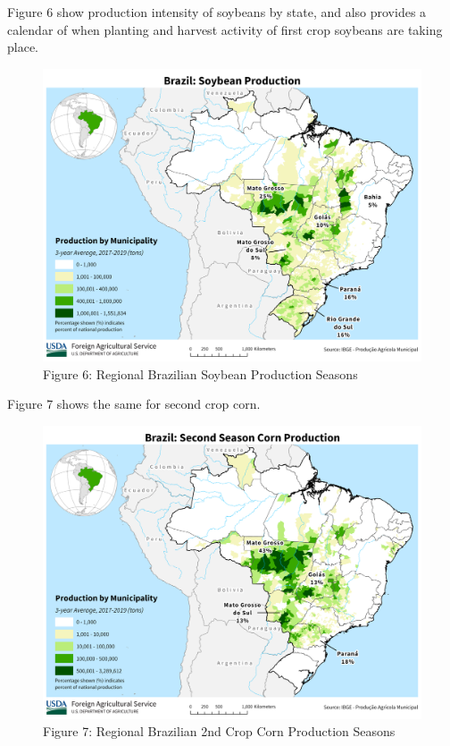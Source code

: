 \documentclass[
  letterpaper,
  DIV=11,
  numbers=noendperiod]{scrreprt}
\begin{document}
Figure 6 show production intensity of soybeans by state, and also
provides a calendar of when planting and harvest activity of first crop
soybeans are taking place.

\begin{figure}

{\centering \includegraphics{assets/Brazil_Soybean.png}

}

\caption{Figure 6: Regional Brazilian Soybean Production Seasons}

\end{figure}

Figure 7 shows the same for second crop corn.

\begin{figure}

{\centering \includegraphics{assets/Brazil_SecondSeason_Corn.png}

}

\caption{Figure 7: Regional Brazilian 2nd Crop Corn Production Seasons}

\end{figure}
\end{document}
